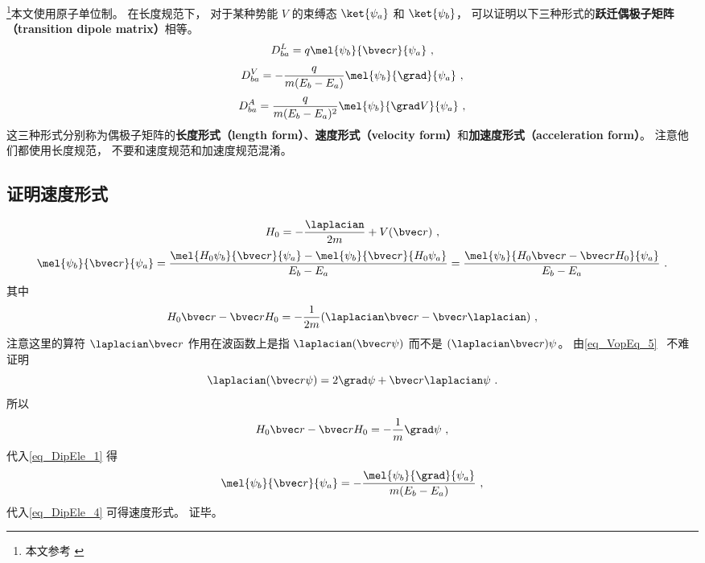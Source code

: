 

\footnote{本文参考 \cite{Bransden}}本文使用原子单位制。 在长度规范下， 对于某种势能 $V$ 的束缚态 $\ket{\psi_a}$ 和 $\ket{\psi_b}$， 可以证明以下三种形式的\textbf{跃迁偶极子矩阵（transition dipole matrix）}相等。
\begin{equation}\label{eq_DipEle_4}
D_{ba}^L = q\mel{\psi_b}{\bvec r}{\psi_a}~,
\end{equation}
\begin{equation}\label{eq_DipEle_3}
D_{ba}^V = -\frac{q}{m(E_b - E_a)}\mel{\psi_b}{\grad}{\psi_a}~,
\end{equation}
\begin{equation}
D_{ba}^A = \frac{q}{m(E_b-E_a)^2} \mel{\psi_b}{\grad V}{\psi_a}~,
\end{equation}
这三种形式分别称为偶极子矩阵的\textbf{长度形式（length form）}、\textbf{速度形式（velocity form）}和\textbf{加速度形式（acceleration form）}。 注意他们都使用长度规范， 不要和速度规范和加速度规范混淆。 %

\subsection{证明速度形式}
\begin{equation}
H_0 = -\frac{\laplacian}{2m} + V(\bvec r)~,
\end{equation}
\begin{equation}\label{eq_DipEle_1}
\mel{\psi_b}{\bvec r}{\psi_a} = \frac{\mel{H_0\psi_b}{\bvec r}{\psi_a} - \mel{\psi_b}{\bvec r}{H_0\psi_a}}{E_b - E_a} = \frac{\mel{\psi_b}{H_0\bvec r - \bvec rH_0}{\psi_a}}{E_b - E_a}~.
\end{equation}
其中
\begin{equation}
H_0\bvec r - \bvec rH_0 = -\frac{1}{2m}(\laplacian \bvec r - \bvec r \laplacian)~,
\end{equation}
注意这里的算符 $\laplacian \bvec r$ 作用在波函数上是指 $\laplacian (\bvec r \psi)$ 而不是 $(\laplacian \bvec r) \psi$。 由\autoref{eq_VopEq_5}~ 不难证明
\begin{equation}
\laplacian (\bvec r \psi) = 2 \grad \psi + \bvec r \laplacian \psi~.
\end{equation}
所以
\begin{equation}
H_0\bvec r - \bvec rH_0 = -\frac{1}{m}\grad \psi~,
\end{equation}
代入\autoref{eq_DipEle_1} 得
\begin{equation}
\mel{\psi_b}{\bvec r}{\psi_a} = -\frac{\mel{\psi_b}{\grad}{\psi_a}}{m(E_b - E_a)}~,
\end{equation}
代入\autoref{eq_DipEle_4} 可得速度形式。 证毕。

